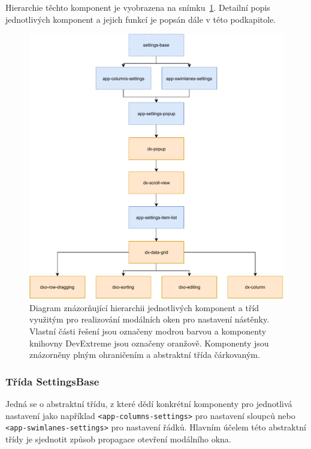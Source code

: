 Hierarchie těchto komponent je vyobrazena na snímku~\ref{img:settings-dia}. Detailní popis jednotlivých komponent a jejich funkcí je popsán dále v této podkapitole.

\begin{figure}[H]
	\centering
	\label{img:settings-dia}
	\includegraphics[width=\textwidth]{obrazky-figures/settings-diagram.pdf}
	\caption{Diagram znázorňující hierarchii jednotlivých komponent a tříd využitým pro realizování modálních oken pro nastavení nástěnky. Vlastní části řešení jsou označeny modrou barvou a komponenty knihovny DevExtreme jsou označeny oranžově. Komponenty jsou znázorněny plným ohraničením a abstraktní třída čárkovaným.}
\end{figure}


\subsubsection*{Třída SettingsBase}
Jedná se o abstraktní třídu, z které dědí konkrétní komponenty pro jednotlivá nastavení jako například \texttt{<app-columns-settings>} pro nastavení sloupců nebo  \texttt{<app-swimlanes-settings>} pro nastavení řádků. Hlavním účelem této abstraktní třídy je sjednotit způsob propagace otevření modálního okna.



